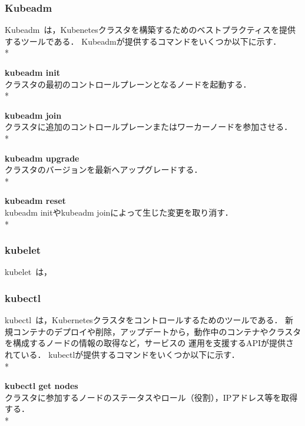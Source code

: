 \subsubsection{Kubeadm}
\label{background:container-orchestration-system:kubernetes:kubeadm}

Kubeadm~\cite{Kubeadm}は，Kubenetesクラスタを構築するためのベストプラクティスを提供するツールである．
Kubeadmが提供するコマンドをいくつか以下に示す．\\*

{\bf kubeadm init}\\
クラスタの最初のコントロールプレーンとなるノードを起動する．\\*

{\bf kubeadm join}\\
クラスタに追加のコントロールプレーンまたはワーカーノードを参加させる．\\*

{\bf kubeadm upgrade}\\
クラスタのバージョンを最新へアップグレードする．\\*

{\bf kubeadm reset}\\
kubeadm initやkubeadm joinによって生じた変更を取り消す．\\*

\subsubsection{kubelet}
\label{background:container-orchestration-system:kubernetes:kubelet}

kubelet~\cite{kubelet}は，

\subsubsection{kubectl}
\label{background:container-orchestration-system:kubernetes:kubectl}

kubectl~\cite{kubectl}は，Kubernetesクラスタをコントロールするためのツールである．
新規コンテナのデプロイや削除，アップデートから，動作中のコンテナやクラスタを構成するノードの情報の取得など，サービスの
運用を支援するAPIが提供されている．
kubectlが提供するコマンドをいくつか以下に示す．\\*

{\bf kubectl get nodes}\\
クラスタに参加するノードのステータスやロール（役割），IPアドレス等を取得する．\\*

